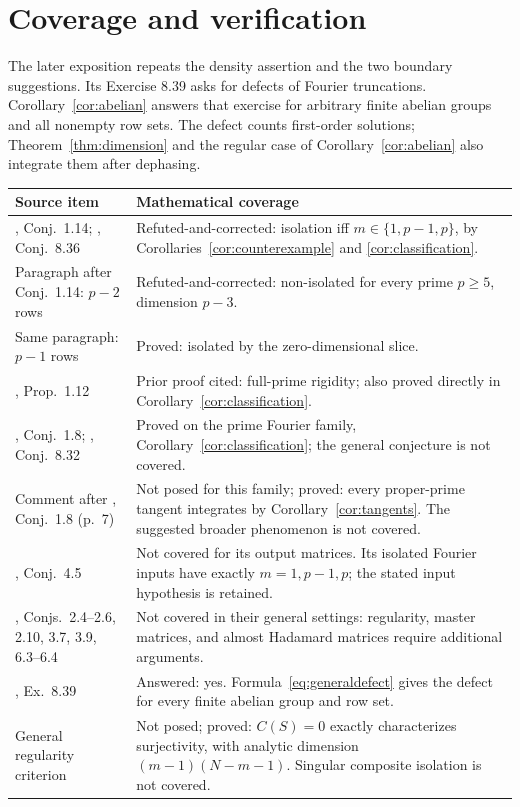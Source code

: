 \documentclass[11pt]{article}
\begin{document}
\section{Coverage and verification}
The later exposition \cite[Conjecture 8.36, pp.~199--200]{Banica}
repeats the density assertion and the two boundary suggestions.
Its Exercise 8.39 asks for defects of Fourier truncations.
Corollary~\ref{cor:abelian} answers that exercise for arbitrary finite
abelian groups and all nonempty row sets. The defect counts first-order
solutions; Theorem~\ref{thm:dimension} and the regular case of
Corollary~\ref{cor:abelian} also integrate them after dephasing.

\begin{center}\small
\begin{tabular}{@{}p{.43\linewidth}p{.50\linewidth}@{}}\toprule
Source item & Mathematical coverage\\\midrule
\cite{BOP}, Conj.~1.14; \cite{Banica}, Conj.~8.36 &
Refuted-and-corrected: isolation iff $m\in\{1,p-1,p\}$, by
Corollaries~\ref{cor:counterexample} and \ref{cor:classification}.\\
Paragraph after Conj.~1.14: $p-2$ rows &
Refuted-and-corrected: non-isolated for every prime $p\geq5$,
dimension $p-3$.\\
Same paragraph: $p-1$ rows & Proved: isolated by the zero-dimensional slice.\\
\cite{BOP}, Prop.~1.12 & Prior proof cited: full-prime rigidity;
also proved directly in Corollary~\ref{cor:classification}.\\
\cite{BOP}, Conj.~1.8; \cite{Banica}, Conj.~8.32 &
Proved on the prime Fourier family, Corollary~\ref{cor:classification};
the general conjecture is not covered.\\
Comment after \cite{BOP}, Conj.~1.8 (p.~7) &
Not posed for this family; proved: every proper-prime tangent
integrates by Corollary~\ref{cor:tangents}. The suggested broader
phenomenon is not covered.\\
\cite{BOP}, Conj.~4.5 & Not covered for its output matrices.
Its isolated Fourier inputs have exactly $m=1,p-1,p$;
the stated input hypothesis is retained.\\
\cite{BOP}, Conjs.~2.4--2.6, 2.10, 3.7, 3.9, 6.3--6.4 &
Not covered in their general settings: regularity, master matrices,
and almost Hadamard matrices require additional arguments.\\
\cite{Banica}, Ex.~8.39 & Answered: yes. Formula~\eqref{eq:generaldefect}
gives the defect for every finite abelian group and row set.\\
General regularity criterion & Not posed; proved:
$C(S)=0$ exactly characterizes surjectivity, with analytic dimension
$(m-1)(N-m-1)$. Singular composite isolation is not covered.\\\bottomrule
\end{tabular}
\end{center}
\end{document}
